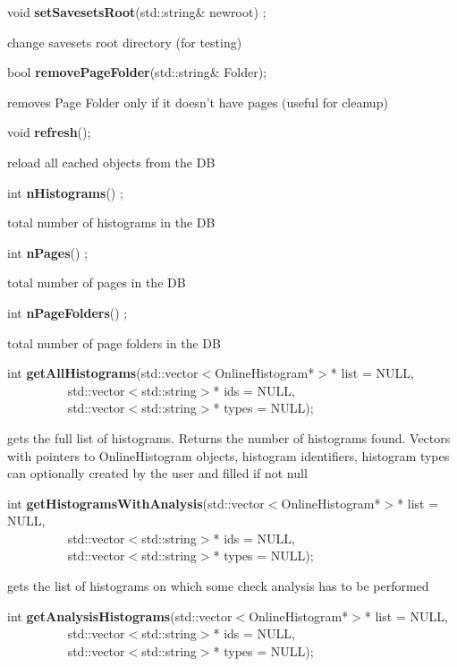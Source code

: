 \item    void {\bf setSavesetsRoot}(std::string\& newroot) ;

 change savesets root directory (for testing)


\item    bool {\bf removePageFolder}(std::string\& Folder);


 removes Page Folder only if it doesn't have pages (useful for cleanup)


\item    void {\bf refresh}();


 reload all cached objects from the DB


\item    int {\bf nHistograms}() ;

 total number of histograms in the DB


\item    int {\bf nPages}() ;

 total number of pages in the DB


\item    int {\bf nPageFolders}() ;

  total number of page folders in the DB


\item    int {\bf getAllHistograms}(std::vector$<$OnlineHistogram*$>$* list = NULL,\\\mbox{}~~~~~~~~~
		       std::vector$<$std::string$>$* ids = NULL,\\\mbox{}~~~~~~~~~
		       std::vector$<$std::string$>$* types = NULL);

 gets the full list of histograms. Returns the number of histograms found. Vectors with pointers
 to OnlineHistogram objects, histogram identifiers, histogram types can optionally created  by the user
 and filled if not null


\item    int {\bf getHistogramsWithAnalysis}(std::vector$<$OnlineHistogram*$>$* list = NULL,\\\mbox{}~~~~~~~~~
				std::vector$<$std::string$>$* ids = NULL,\\\mbox{}~~~~~~~~~
				std::vector$<$std::string$>$* types = NULL);

 gets the list of histograms on which some check analysis has to be performed 


\item    int {\bf getAnalysisHistograms}(std::vector$<$OnlineHistogram*$>$* list = NULL,\\\mbox{}~~~~~~~~~
			    std::vector$<$std::string$>$* ids = NULL,\\\mbox{}~~~~~~~~~
			    std::vector$<$std::string$>$* types = NULL);


